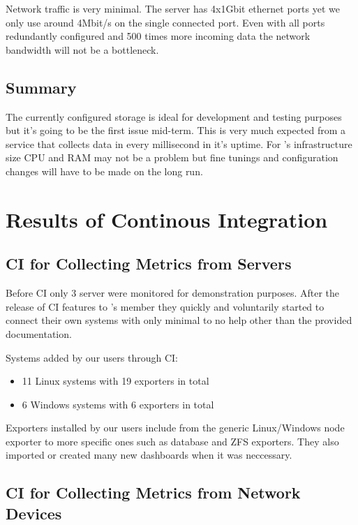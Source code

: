 Network traffic is very minimal. The server has 4x1Gbit ethernet ports yet we
only use around 4Mbit/s on the single connected port. Even with all ports
redundantly configured and 500 times more incoming data the network bandwidth
will not be a bottleneck.

\subsection{Summary}

The currently configured storage is ideal for development and testing purposes
but it's going to be the first issue mid-term. This is very much expected from
a service that collects data in every millisecond in it's uptime. For \kszk's
infrastructure size CPU and RAM may not be a problem but fine tunings and
configuration changes will have to be made on the long run.

\section{Results of Continous Integration}

\subsection{CI for Collecting Metrics from Servers}

Before CI only 3 server were monitored for demonstration purposes. After the
release of CI features to \kszk's member they quickly and voluntarily started
to connect their own systems with only minimal to no help other than the
provided documentation.

Systems added by our users through CI:
\begin{itemize}
	\item 11 Linux systems with 19 exporters in total
	\item 6 Windows systems with 6 exporters in total
\end{itemize}

Exporters installed by our users include from the generic Linux/Windows node
exporter to more specific ones such as database and ZFS exporters. They also
imported or created many new dashboards when it was neccessary.

\subsection{CI for Collecting Metrics from Network Devices}

